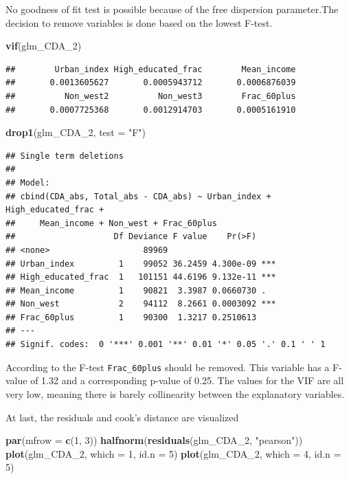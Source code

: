 \documentclass[11pt,]{article}
\newenvironment{Shaded}{\begin{snugshade}}{\end{snugshade}}
\newcommand{\KeywordTok}[1]{\textcolor[rgb]{0.13,0.29,0.53}{\textbf{#1}}}
\newcommand{\DataTypeTok}[1]{\textcolor[rgb]{0.13,0.29,0.53}{#1}}
\newcommand{\DecValTok}[1]{\textcolor[rgb]{0.00,0.00,0.81}{#1}}
\newcommand{\StringTok}[1]{\textcolor[rgb]{0.31,0.60,0.02}{#1}}
\newcommand{\NormalTok}[1]{#1}
\begin{document}
No goodness of fit test is possible because of the free dispersion
parameter.The decision to remove variables is done based on the lowest
F-test.

\begin{Shaded}
\begin{Highlighting}[]
\KeywordTok{vif}\NormalTok{(glm_CDA_}\DecValTok{2}\NormalTok{)}
\end{Highlighting}
\end{Shaded}

\begin{verbatim}
##        Urban_index High_educated_frac        Mean_income 
##       0.0013605627       0.0005943712       0.0006876039 
##          Non_west2          Non_west3        Frac_60plus 
##       0.0007725368       0.0012914703       0.0005161910
\end{verbatim}

\begin{Shaded}
\begin{Highlighting}[]
\KeywordTok{drop1}\NormalTok{(glm_CDA_}\DecValTok{2}\NormalTok{, }\DataTypeTok{test =} \StringTok{"F"}\NormalTok{)}
\end{Highlighting}
\end{Shaded}

\begin{verbatim}
## Single term deletions
## 
## Model:
## cbind(CDA_abs, Total_abs - CDA_abs) ~ Urban_index + High_educated_frac + 
##     Mean_income + Non_west + Frac_60plus
##                    Df Deviance F value    Pr(>F)    
## <none>                   89969                      
## Urban_index         1    99052 36.2459 4.300e-09 ***
## High_educated_frac  1   101151 44.6196 9.132e-11 ***
## Mean_income         1    90821  3.3987 0.0660730 .  
## Non_west            2    94112  8.2661 0.0003092 ***
## Frac_60plus         1    90300  1.3217 0.2510613    
## ---
## Signif. codes:  0 '***' 0.001 '**' 0.01 '*' 0.05 '.' 0.1 ' ' 1
\end{verbatim}

According to the F-test \texttt{Frac\_60plus} should be removed. This
variable has a F-value of 1.32 and a corresponding p-value of 0.25. The
values for the VIF are all very low, meaning there is barely
collinearity between the explanatory variables.

At last, the residuals and cook's distance are visualized

\begin{Shaded}
\begin{Highlighting}[]
\KeywordTok{par}\NormalTok{(}\DataTypeTok{mfrow =} \KeywordTok{c}\NormalTok{(}\DecValTok{1}\NormalTok{, }\DecValTok{3}\NormalTok{))}
\KeywordTok{halfnorm}\NormalTok{(}\KeywordTok{residuals}\NormalTok{(glm_CDA_}\DecValTok{2}\NormalTok{, }\StringTok{"pearson"}\NormalTok{))}
\KeywordTok{plot}\NormalTok{(glm_CDA_}\DecValTok{2}\NormalTok{, }\DataTypeTok{which =} \DecValTok{1}\NormalTok{, }\DataTypeTok{id.n =} \DecValTok{5}\NormalTok{)}
\KeywordTok{plot}\NormalTok{(glm_CDA_}\DecValTok{2}\NormalTok{, }\DataTypeTok{which =} \DecValTok{4}\NormalTok{, }\DataTypeTok{id.n =} \DecValTok{5}\NormalTok{)}
\end{Highlighting}
\end{Shaded}
\end{document}
